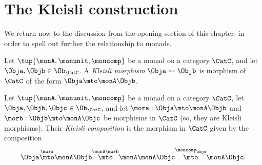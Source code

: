 

\section{The Kleisli construction}
\label{sec:Kleisli}

We return now to the discussion from the opening section of this chapter, in order to spell out further the relationship to monads. 


\begin{ctdefinition}\label{def:kleisli-morphisms}
Let $\tup{\monA, \monunit, \moncomp}$ be a monad on a category $\CatC$, and let $\Obja, \Objb \in \Ob_\CatC$. A 
\emph{Kleisli morphism} $\Obja \rightsquigarrow \Objb$ is morphism of $\CatC$ of the form $\Obja \mto \monA \Objb$. 
\end{ctdefinition}


\begin{ctdefinition}\label{def:kleisli-composition}
Let $\tup{\monA, \monunit, \moncomp}$ be a monad on a category $\CatC$, let $\Obja, \Objb, \Objc \in \Ob_\CatC$,  and let $\mora : \Obja \mto \monA \Objb$ and $\morb : \Objb \mto \monA \Objc$ be morphisms in $\CatC$ (so, they are Kleisli morphisms). Their \emph{Kleisli composition} is the morphism in $\CatC$ given by the composition
\begin{equation}
\Obja \overset{\mora}{\mto} \monA \Objb \overset{\monA \morb}{\mto} \monA \monA \Objc \overset{\moncomp_\Objc}{\mto} \monA \Objc.
\end{equation}
\end{ctdefinition}


